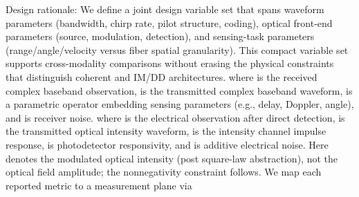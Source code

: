 \markdownRendererDocumentBegin
\markdownRendererSectionBegin
{}\markdownRendererInterblockSeparator
{}\markdownRendererSectionBegin
{}\markdownRendererInterblockSeparator
{}\markdownRendererSectionBegin
{}\markdownRendererInterblockSeparator
{}Design rationale: We define a joint design variable set that spans waveform parameters (bandwidth, chirp rate, pilot structure, coding), optical front-end parameters (source, modulation, detection), and sensing-task parameters (range/angle/velocity versus fiber spatial granularity). This compact variable set supports cross-modality comparisons without erasing the physical constraints that distinguish coherent and IM/DD architectures.\markdownRendererParagraphSeparator
{}\markdownRendererSoftLineBreak
{}\markdownRendererSoftLineBreak
{}where  is the received complex baseband observation,  is the transmitted complex baseband waveform,  is a parametric operator embedding sensing parameters \markdownRendererInlineMath{\boldsymbol{\theta}} (e.g., delay, Doppler, angle), and  is receiver noise.\markdownRendererParagraphSeparator
{}\markdownRendererSoftLineBreak
{}\markdownRendererSoftLineBreak
{}where  is the electrical observation after direct detection,  is the transmitted optical intensity waveform,  is the intensity channel impulse response,  is photodetector responsivity, and  is additive electrical noise. Here  denotes the modulated optical intensity (post square-law abstraction), not the optical field amplitude; the nonnegativity constraint follows.\markdownRendererParagraphSeparator
{} We map each reported metric  to a measurement plane via\markdownRendererSoftLineBreak
